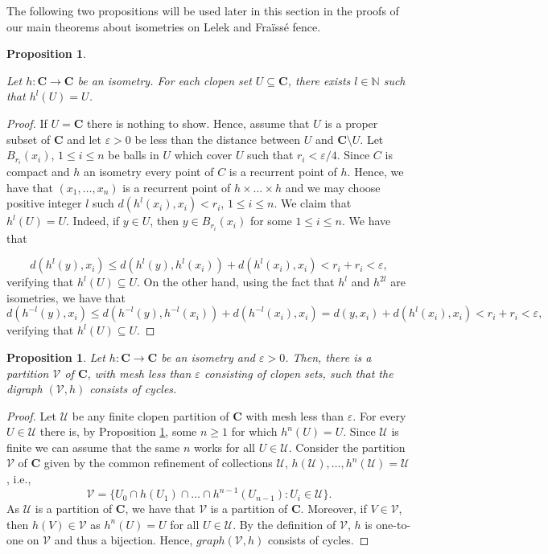 \documentclass[11pt]{amsart}
\newtheorem{proposition}[theorem]{Proposition}
\newcommand{\N}{\mathbb{N}}  %
\newcommand{\cantor}{\mathbf C}
\begin{document}
{The following two propositions will be used later in this section in the proofs of our main theorems about isometries on Lelek and Fra\"iss\'e fence.


\begin{proposition}\label{prop:ClopenIsPeriodic}
     
 Let $h: \cantor \rightarrow \cantor$ be an isometry.
For each clopen set $U \subseteq \cantor$, there exists $l \in \N$ such that $h^l(U)=U$. 
\end{proposition}
\begin{proof} If $U = \cantor$ there is nothing to show. Hence, assume that $U$
 is a proper subset of $\cantor$ and let $\varepsilon>0$ be less than the distance between $U$ and $\cantor \setminus U$.
 Let $B_{r_i}(x_i)$, $1 \le i \le n$ be balls in $U$ which cover $U$ such that $r_i < \varepsilon/4$. Since $C$ is compact and $h$ an isometry every point of $C$ is a recurrent point of $h$. Hence, we have that $(x_1, \ldots, x_n)$ is a recurrent point of $h \times \ldots \times h$ and we may choose positive integer $l$ such $d( h^l(x_i),x_i) < r_i$,  $1 \le i \le n$.
 We claim that  $h^l(U) =U$. Indeed, if $y \in U$, then $y \in B_{r_i}(x_i)$ for some $1 \le i \le n$. We have that  
 
 \[ d(h^l(y), x_i)  \le d(h^l(y), h^l(x_i)) + d( h^l(x_i), x_i) < r_i + r_i < \varepsilon, \]
 verifying that $h^l(U) \subseteq U$. On the other hand, using the fact that $h^l$ and $h^{2l}$ are isometries,  we have that 
 \[ d(h^{-l}(y), x_i)  \le d(h^{-l}(y), h^{-l}(x_i)) + d( h^{-l}(x_i), x_i) = d(y, x_i) + d( h^{l}(x_i), x_i) < r_i + r_i < \varepsilon, \]
 verifying that $h^l(U) \subseteq U$.
 \end{proof}


\begin{proposition}\label{prop:isohelp}
    Let $h: \cantor \rightarrow \cantor$ be an isometry and $\varepsilon >0$. Then, there is a partition ${\mathcal V}$ of $\cantor$, with mesh less than $\varepsilon$ consisting of clopen sets, such that the digraph $({\mathcal V},h)$ consists of cycles. 
\end{proposition}

\begin{proof}
Let $\mathcal U$ be any finite clopen partition of $\cantor$ with mesh less than $\varepsilon$.
For every $U\in\mathcal U$ there is, by Proposition \ref{prop:ClopenIsPeriodic}, some $n\geq 1$ for which $h^n(U)=U$. Since $\mathcal U$ is finite we can assume that the same $n$ works for all $U\in\mathcal U$.
Consider the partition ${\mathcal V}$ of $\cantor$ given by the common refinement of collections $\mathcal U$, $h(\mathcal U),\dots, h^n(\mathcal U)=\mathcal U$, i.e., 
\[ {\mathcal V} = \{ U_0\cap h(U_1)\cap \dots \cap h^{n-1}(U_{n-1}): U_i \in {\mathcal U}
\}.\]
As ${\mathcal U}$ is a partition of  $\cantor$, we have that ${\mathcal V}$ is a partition of $\cantor$. Moreover, if $V \in {\mathcal V}$, then $h(V) \in {\mathcal V}$ as $h^n(U) = U$ for all $U \in {\mathcal U}$. By the definition of ${\mathcal V}$, $h$ is one-to-one on ${\mathcal V}$ and thus a bijection. Hence, $graph ({\mathcal V},h)$ consists of cycles. 


\end{proof}}
\end{document}
